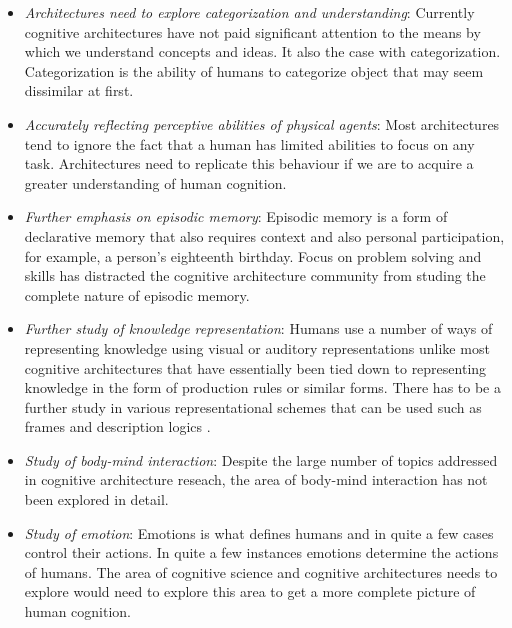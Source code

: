 \begin{itemize}
\item \emph{Architectures need to explore categorization and
    understanding}: Currently cognitive architectures have not paid
  significant attention to the means by which we understand concepts
  and ideas. It also the case with categorization. Categorization is
  the ability of humans to categorize object that may seem dissimilar
  at first. 
  
\item \emph{Accurately reflecting perceptive abilities of physical
    agents}: Most architectures tend to ignore the fact that a human
  has limited abilities to focus on any task. Architectures need to
  replicate this behaviour if we are to acquire a greater
  understanding of human cognition.

  \item \emph{Further emphasis on episodic memory}: Episodic memory is
    a form of declarative memory that also requires context and also
    personal participation\cite{09011999}, for example, a person's
    eighteenth birthday.  Focus on problem solving and skills has
    distracted the cognitive architecture community from studing the
    complete nature of episodic memory.

\item \emph{Further study of knowledge representation}: Humans use a
  number of ways of representing knowledge using visual or auditory
  representations unlike most cognitive architectures that have
  essentially been tied down to representing knowledge in the form of
  production rules or similar forms. There has to be a further study
  in various representational schemes that can be used such as
  frames\cite{Minsky1974a} and description logics
  \cite{nardi-brachman:2003a}. 

\item \emph{Study of body-mind interaction}: Despite the large number
  of topics addressed in cognitive architecture reseach, the area of
  body-mind interaction has not been explored in detail.


\item \emph{Study of emotion}: Emotions is what defines humans and in
  quite a few cases control their actions. In quite a few instances
  emotions determine the actions of humans. The area of cognitive
  science and cognitive architectures needs to explore would need to
  explore this area to get a more complete picture of human cognition.


\end{itemize}
